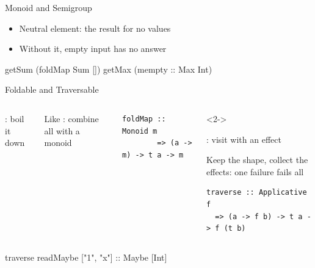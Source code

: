 \begin{frame}{Monoid and Semigroup}
\vspace*{-7mm}
\begin{itemize}
   \item<1-> Neutral element: the result for no values
   \item<2-> Without it, empty input has no answer\supercite{yorgey2012monoids}
\end{itemize}
\vspace{2mm}
\begin{ghcisession}[start=3]
getSum (foldMap Sum [])
getMax (mempty :: Max Int)
\end{ghcisession}
\end{frame}

\begin{frame}[fragile]{Foldable and Traversable}
\begin{fullwidth}
\begin{columns}[T,onlytextwidth]
%
{\centering\textbf{}: boil it down\par\vspace{1mm}
\par\vspace{1mm}}
Like : combine all with a monoid\supercite{yorgey2009typeclassopedia}\\[1mm]
\begin{verbatim}
foldMap :: Monoid m
        => (a -> m) -> t a -> m
\end{verbatim}
%
\begin{uncoverenv}<2->
{\centering\textbf{}: visit with an effect\par\vspace{1mm}
\par\vspace{1mm}}
Keep the shape, collect the effects: one failure fails all\supercite{gibbons2009iterator}\\[1mm]
\begin{verbatim}
traverse :: Applicative f
  => (a -> f b) -> t a -> f (t b)
\end{verbatim}
\end{uncoverenv}
\end{columns}
\vspace{-2mm}
\begin{ghcisession}[start=3]
traverse readMaybe ["1", "x"] :: Maybe [Int]
\end{ghcisession}
\end{fullwidth}
\end{frame}

